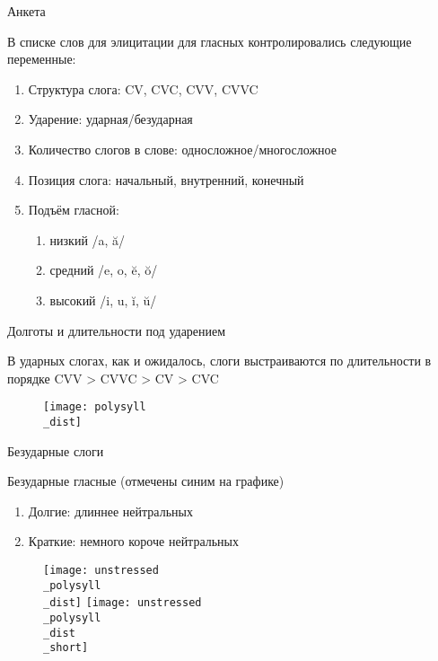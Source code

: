 \documentclass[10 pt, handout]{beamer}
\begin{document}
\begin{frame}{Анкета}

	В списке слов для элицитации для гласных контролировались следующие переменные:

	\begin{enumerate}[\ding{77}]
		\item Структура слога: CV, CVC, CVV, CVVC
		\item Ударение: ударная/безударная
		\item Количество слогов в слове: односложное/многосложное
		\item Позиция слога: начальный, внутренний, конечный
		\item Подъём гласной:	
			\begin{enumerate}[\ding{163}]
				\item низкий /a, ă/
				\item средний /e, o, ĕ, ŏ/
				\item высокий /i, u, ĭ, ŭ/
			\end{enumerate}
	\end{enumerate}

\end{frame}

\begin{frame}{Долготы и длительности под ударением}

	В ударных слогах, как и ожидалось, слоги выстраиваются по длительности в порядке CVV > CVVC > CV > CVC %
		
	\begin{figure}[H]
		\texttt{[image: polysyll\\\_dist]}
	\end{figure}

\end{frame}

\begin{frame}{Безударные слоги}

	Безударные гласные (отмечены синим на графике)
		
	\begin{enumerate}[\ding{226}]
		\item Долгие: длиннее нейтральных
		\item Краткие: немного короче нейтральных
	\end{enumerate}
		
	\begin{figure}[H]
		\texttt{[image: unstressed\\\_polysyll\\\_dist]}
		\hfill
		\texttt{[image: unstressed\\\_polysyll\\\_dist\\\_short]}
	\end{figure}

\end{frame}
\end{document}
